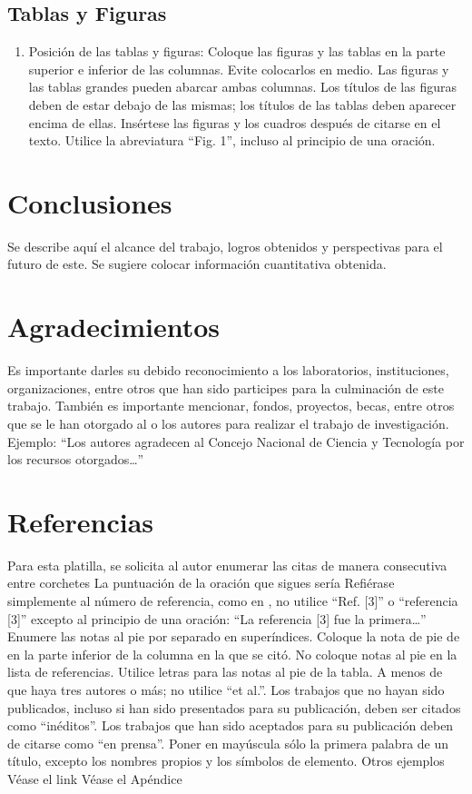     \subsection{Tablas y Figuras}
    
    \begin{enumerate}
        \item Posición de las tablas y figuras: Coloque las figuras y las tablas en la parte superior e inferior de las columnas. Evite colocarlos en medio. Las figuras y las tablas grandes pueden abarcar ambas columnas. Los títulos de las figuras deben de estar debajo de las mismas; los títulos de las tablas deben aparecer encima de ellas. Insértese las figuras y los cuadros después de citarse en el texto. Utilice la abreviatura “Fig. 1”, incluso al principio de una oración. 
    \end{enumerate}
    
    \section{Conclusiones}
    
    Se describe aquí el alcance del trabajo, logros obtenidos y perspectivas para el futuro de este. Se sugiere colocar información cuantitativa obtenida.
    
    \section{Agradecimientos}
    
    Es importante darles su debido reconocimiento a los laboratorios, instituciones, organizaciones, entre otros que han sido participes para la culminación de este trabajo. También es importante mencionar, fondos, proyectos, becas, entre otros que se le han otorgado al o los autores para realizar el trabajo de investigación. Ejemplo: “Los autores agradecen al Concejo Nacional de Ciencia y Tecnología por los recursos otorgados…”
    
    \section*{Referencias}
    
    Para esta platilla, se solicita al autor enumerar las citas de manera consecutiva entre corchetes 
    La puntuación de la oración que sigues sería  
    Refiérase simplemente al número de referencia, como en , no utilice “Ref. [3]” o “referencia [3]” excepto al principio de una oración: “La referencia [3] fue la primera…”
    Enumere las notas al pie por separado en superíndices. Coloque la nota de pie de en la parte inferior de la columna en la que se citó. No coloque notas al pie en la lista de referencias. Utilice letras para las notas al pie de la tabla.
    A menos de que haya tres autores o más; no utilice “et al.”. Los trabajos que no hayan sido publicados, incluso si han sido presentados para su publicación, deben ser citados como “inéditos”. Los trabajos que han sido aceptados para su publicación deben de citarse como “en prensa”. Poner en mayúscula sólo la primera palabra de un título, excepto los nombres propios y los símbolos de elemento. 
    Otros ejemplos 
    Véase el link  Véase el Apéndice 
    
